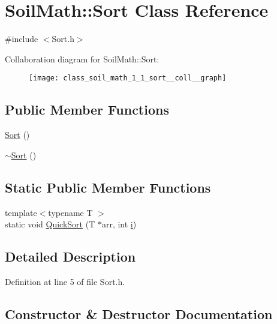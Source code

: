\hypertarget{class_soil_math_1_1_sort}{}\section{Soil\+Math\+:\+:Sort Class Reference}
\label{class_soil_math_1_1_sort}


{\ttfamily \#include $<$Sort.\+h$>$}



Collaboration diagram for Soil\+Math\+:\+:Sort\+:\nopagebreak
\begin{figure}[H]
\begin{center}
\leavevmode
\texttt{[image: class\_soil\_math\_1\_1\_sort\_\_coll\_\_graph]}
\end{center}
\end{figure}
\subsection*{Public Member Functions}
\begin{DoxyCompactItemize}
\item 
\hyperlink{class_soil_math_1_1_sort_ac5553af8753454e71e6d621690fdab3f}{Sort} ()
\item 
\hyperlink{class_soil_math_1_1_sort_a62273dbd3620f999201abacdff5e2557}{$\sim$\+Sort} ()
\end{DoxyCompactItemize}
\subsection*{Static Public Member Functions}
\begin{DoxyCompactItemize}
\item 
{\footnotesize template$<$typename T $>$ }\\static void \hyperlink{class_soil_math_1_1_sort_adca7b48be7482f89767b806ad2016d67}{Quick\+Sort} (T $\ast$arr, int \hyperlink{_v_s_a___u_t_2_comparision_pictures_2_createtest_image_8m_a6f6ccfcf58b31cb6412107d9d5281426}{i})
\end{DoxyCompactItemize}


\subsection{Detailed Description}


Definition at line 5 of file Sort.\+h.



\subsection{Constructor \& Destructor Documentation}
\hypertarget{class_soil_math_1_1_sort_ac5553af8753454e71e6d621690fdab3f}{}
